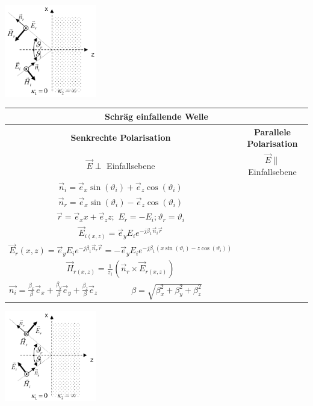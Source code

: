 		\begin{minipage}{4.3cm}
			\includegraphics[width=4cm]{./bilder/EMW_LHR_SchraegSenkrechtPolarisiert.png} 
        \end{minipage}
		\renewcommand{\arraystretch}{1.6}
		\begin{tabular}{| c || c | }
			\hline
				\multicolumn{2}{|c|}{\textbf{Schräg einfallende Welle}} \\
			\hline
				\textbf{Senkrechte Polarisation}
				& 
				\textbf{Parallele Polarisation} \\	
			\hline		
				$\vec{E} \perp $ Einfallsebene
				& 
				$\vec{E} \parallel $ Einfallsebene \\
			\hline	
 				$\vec{n}_i = \vec{e}_x \sin(\vartheta_i)+\vec{e}_z \cos(\vartheta_i)$&\\
 				$\vec{n}_r=\vec{e}_x \sin(\vartheta_i)- \vec{e}_z \cos(\vartheta_i)$ &\\
  				$\vec{r}=\vec{e}_x x+\vec{e}_z z;$ 
 				$E_r=-E_i; \vartheta_r =\vartheta_i$&\\
 				$\vec{E}_{i(x,z)} =\vec{e}_y E_i e^{-j \beta_1 \vec{n}_i \vec{r}}$&\\ 
 				$\vec{E}_r(x,z) =\vec{e}_y E_i e^{-j \beta_1 \vec{n}_r
 				\vec{r}}=- \vec{e}_y E_i e^{-j \beta_1
 				(x\sin(\vartheta_i)-z\cos(\vartheta_i))}$&\\
 				$\vec{H}_{r(x,z)}=\frac{1}{z_1}(\vec{n}_r\times \vec{E}_{r(x,z)})$&\\
 				\hline
 				\multicolumn{2}{|l|}{
				$\vec{n_i}=
				\frac{\beta_x}{\beta}\vec{e}_x + \frac{\beta_y}{\beta} \vec{e}_y + 
				\frac{\beta_z}{\beta} \vec{e}_z
				\qquad \qquad \beta=\sqrt{\beta_x^2+\beta_y^2+\beta_z^2}$}\\
			\hline
   		\end{tabular}
		\renewcommand{\arraystretch}{1}	
		\begin{minipage}{4.3cm}
			\includegraphics[width=4cm]{./bilder/EMW_LHR_SchraegParallelPolarisiert.png} 
        \end{minipage}	

